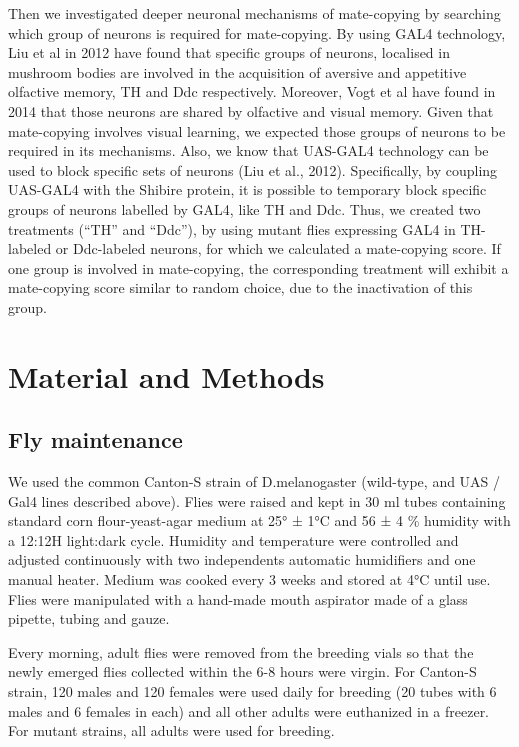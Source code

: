 \documentclass[a4paper, 12pt]{article}
\begin{document}
	Then we investigated deeper neuronal mechanisms of mate-copying by searching which group of neurons is required for mate-copying. By using GAL4 technology, Liu et al in 2012 have found that specific groups of neurons, localised in mushroom bodies are involved in the acquisition of aversive and appetitive olfactive memory, TH and Ddc respectively. Moreover, Vogt et al have found in 2014 that those neurons are shared by olfactive and visual memory. Given that mate-copying involves visual learning, we expected those groups of neurons to be required in its mechanisms. Also, we know that UAS-GAL4 technology can be used to block specific sets of neurons (Liu et al., 2012). Specifically, by coupling UAS-GAL4 with the Shibire protein, it is possible to temporary block specific groups of neurons labelled by GAL4, like TH and Ddc. Thus, we created two treatments (“TH” and “Ddc”), by using mutant flies expressing GAL4 in TH-labeled or Ddc-labeled neurons, for which we calculated a mate-copying score. If one group is involved in mate-copying, the corresponding treatment will exhibit a mate-copying score similar to random choice, due to the inactivation of this group.
	
	\section{Material and Methods}

	\subsection{Fly maintenance}
	
	We used the common Canton-S strain of D.melanogaster (wild-type, and UAS / Gal4 lines described above). Flies were raised and kept in 30 ml tubes containing standard corn flour-yeast-agar medium at 25° ± 1°C and 56 ± 4 \% humidity with a 12:12H light:dark cycle. Humidity and temperature were controlled and adjusted continuously with two independents automatic humidifiers and one manual heater. Medium was cooked every 3 weeks and stored at 4°C until use. Flies were manipulated with a hand-made mouth aspirator made of a glass pipette, tubing and gauze.
	
	Every morning, adult flies were removed from the breeding vials so that the newly emerged flies collected within the 6-8 hours were virgin. For Canton-S strain, 120 males and 120 females were used daily for breeding (20 tubes with 6 males and 6 females in each) and all other adults were euthanized in a freezer. For mutant strains, all adults were used for breeding. 
	
\end{document}
